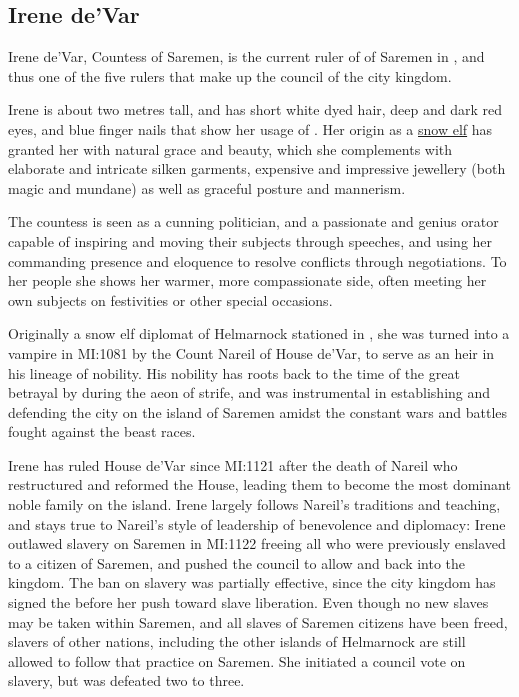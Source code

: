 \subsection{Irene de'Var}
\label{sec:Irene deVar}

Irene de'Var, Countess of Saremen, is the current ruler of  of Saremen in , and thus one of the five
rulers that make up the council of the city kingdom.

Irene is about two metres tall, and has short white dyed hair, deep and dark
red eyes, and blue finger nails that show her usage of .
Her origin as a \hyperref[sec:Snow Elves]{snow elf} has granted her with
natural grace and beauty, which she complements with elaborate and intricate
silken garments, expensive and impressive jewellery (both magic and mundane)
as well as graceful posture and mannerism.

The countess is seen as a cunning politician, and a passionate and genius
orator capable of inspiring and moving their subjects through speeches, and
using her commanding presence and eloquence to resolve conflicts through
negotiations. To her people she shows her warmer, more compassionate side,
often meeting her own subjects on festivities or other special occasions.

Originally a snow elf diplomat of Helmarnock stationed in ,
she was turned into a vampire in MI:1081 by the Count Nareil of House de'Var,
to serve as an heir in his lineage of nobility. His nobility has roots back to
the time of the great betrayal by  during the aeon of
strife, and was instrumental in establishing and defending the city on the
island of Saremen amidst the constant wars and battles fought against the
beast races.

Irene has ruled House de'Var since MI:1121 after the death of Nareil who
restructured and reformed the House, leading them to become the most dominant
noble family on the island. Irene largely follows Nareil's traditions and
teaching, and stays true to Nareil's style of leadership of benevolence and
diplomacy: Irene outlawed slavery on Saremen in MI:1122 freeing all who were
previously enslaved to a citizen of Saremen, and pushed the council to allow
 and  back into the kingdom. The ban
on slavery was partially effective, since the city kingdom has signed the
 before her push toward slave liberation. Even
though no new slaves may be taken within Saremen, and all slaves of Saremen
citizens have been freed, slavers of other nations, including the other
islands of Helmarnock are still allowed to follow that practice on Saremen.
She initiated a council vote on slavery, but was defeated two to three.

